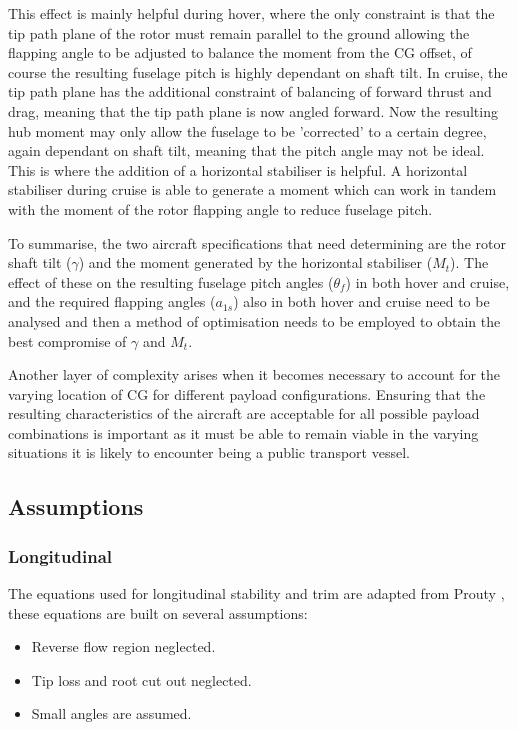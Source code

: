 \documentclass[11pt,a4paper]{article}
\begin{document}
This effect is mainly helpful during hover, where the only constraint is that the tip path plane of the rotor must remain parallel to the ground allowing the flapping angle to be adjusted to balance the moment from the CG offset, of course the resulting fuselage pitch is highly dependant on shaft tilt. In cruise, the tip path plane has the additional constraint of balancing of forward thrust and drag, meaning that the tip path plane is now angled forward. Now the resulting hub moment may only allow the fuselage to be 'corrected' to a certain degree, again dependant on shaft tilt, meaning that the pitch angle may not be ideal. \\
This is where the addition of a horizontal stabiliser is helpful. A horizontal stabiliser during cruise is able to generate a moment which can work in tandem with the moment of the rotor flapping angle to reduce fuselage pitch.

To summarise, the two aircraft specifications that need determining are the rotor shaft tilt ($\gamma$) and the moment generated by the horizontal stabiliser ($M_t$). The effect of these on the resulting fuselage pitch angles ($\theta_f$) in both hover and cruise, and the required flapping angles ($a_{1s}$) also in both hover and cruise need to be analysed and then a method of optimisation needs to be employed to obtain the best compromise of $\gamma$ and $M_t$.

Another layer of complexity arises when it becomes necessary to account for the varying location of CG for different payload configurations. Ensuring that the resulting characteristics of the aircraft are acceptable for all possible payload combinations is important as it must be able to remain viable in the varying situations it is likely to encounter being a public transport vessel.
\subsection{Assumptions}
\subsubsection{Longitudinal}
The equations used for longitudinal stability and trim are adapted from Prouty \cite{prouty}, these equations are built on several assumptions:

\begin{itemize}
    \item Reverse flow region neglected.
    \item Tip loss and root cut out neglected.
    \item Small angles are assumed.
\end{itemize}{}
\end{document}
